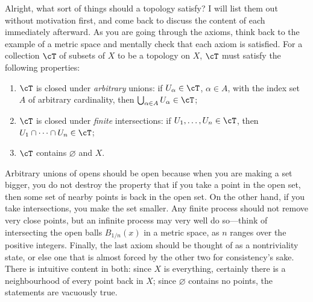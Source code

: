 \documentclass{axolotl}
\begin{document}
Alright, what sort of things should a topology satisfy? I will list them out
without motivation first, and come back to discuss the content of each
immediately afterward. As you are going through the axioms, think back to the
example of a metric space and mentally check that each axiom is satisfied. For
a collection \(\cT\) of subsets of \(X\) to be a topology on \(X\), \(\cT\)
must satisfy the following properties:
\begin{enumerate}
  \item \(\cT\) is closed under \textit{arbitrary} unions: if \(U_\alpha \in
      \cT\), \(\alpha \in A\), with the index set \(A\) of arbitrary cardinality,
    then \(\bigcup_{\alpha \in A} U_\alpha \in \cT\);
  \item \(\cT\) is closed under \textit{finite} intersections: if
    \(U_1,\ldots,U_n \in \cT\), then \(U_1 \cap \cdots \cap U_n \in \cT\);
  \item \(\cT\) contains \(\varnothing\) and \(X\).
\end{enumerate}
Arbitrary unions of opens should be open because when you are making a set
bigger, you do not destroy the property that if you take a point in the open
set, then some set of nearby points is back in the open set. On the other hand,
if you take intersections, you make the set smaller. Any finite process should
not remove very close points, but an infinite process may very well do
so---think of intersecting the open balls \(B_{1/n}(x)\) in a metric space, as
\(n\) ranges over the positive integers. Finally, the last axiom should be
thought of as a nontriviality state, or else one that is almost forced by the
other two for consistency's sake. There is intuitive content in both: since
\(X\) is everything, certainly there is a neighbourhood of every point back in
\(X\); since \(\varnothing\) contains no points, the statements are vacuously
true.
\end{document}
